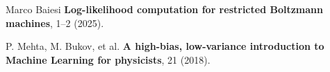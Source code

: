 \documentclass[prl,twocolumn]{revtex4-1}
\begin{document}
\begin{thebibliography}{99}

  Marco Baiesi {\bf Log-likelihood computation for restricted Boltzmann machines}, 1--2 (2025).
  
  P. Mehta, 
  M. Bukov, et al. {\bf A high-bias, low-variance introduction to Machine Learning for physicists}, 21 (2018).
  
\end{thebibliography}

\clearpage
\end{document}
